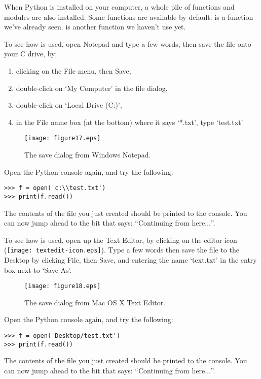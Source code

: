 When Python is installed on your computer, a whole pile of functions and modules are also installed. Some functions are available by default.   is a function we've already seen.  is another function we haven't use yet.

\begin{WINDOWS}

To see how  is used, open Notepad and type a few words, then save the file onto your C drive, by:

\begin{enumerate}
 \item clicking on the File menu, then Save,
 \item double-click on `My Computer' in the file dialog,
 \item double-click on `Local Drive (C:)',
 \item in the File name box (at the bottom) where it says `*.txt', type `test.txt'
\end{enumerate}

\begin{figure}
\begin{center}
\texttt{[image: figure17.eps]}
\end{center}
\caption{The save dialog from Windows Notepad.}\label{fig17}
\end{figure}

Open the Python console again, and try the following:

\begin{Verbatim}[frame=single]
>>> f = open('c:\\test.txt')
>>> print(f.read())
\end{Verbatim}

The contents of the file you just created should be printed to the console. You can now jump ahead to the bit that says: ``Continuing from here$\ldots$''.
\end{WINDOWS}

\begin{MAC}
To see how  is used, open up the Text Editor, by clicking on the editor icon (\texttt{[image: textedit-icon.eps]}).  Type a few words then save the file to the Desktop by clicking File, then Save, and entering the name `text.txt' in the entry box next to `Save As'.

\begin{figure}
\begin{center}
\texttt{[image: figure18.eps]}
\end{center}
\caption{The save dialog from Mac OS X Text Editor.}\label{fig18}
\end{figure}

Open the Python console again, and try the following:

\begin{Verbatim}[frame=single]
>>> f = open('Desktop/test.txt')
>>> print(f.read())
\end{Verbatim}

The contents of the file you just created should be printed to the console.  You can now jump ahead to the bit that says: ``Continuing from here$\ldots$''.
\end{MAC}

